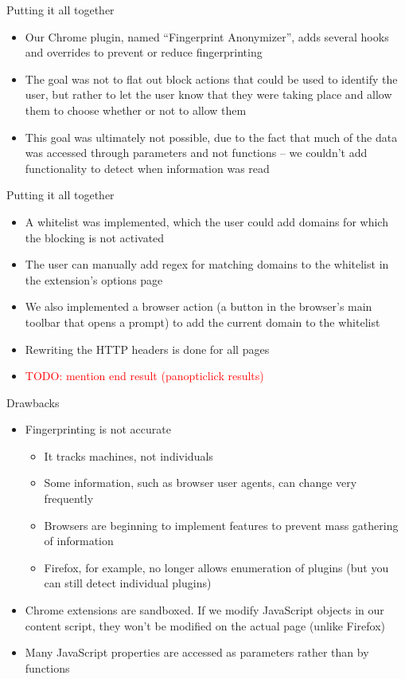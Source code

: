 \begin{frame}[fragile,t]{Putting it all together}
	\begin{itemize}
		\item Our Chrome plugin, named ``Fingerprint Anonymizer'', adds several hooks and overrides to prevent or reduce fingerprinting
		\item The goal was not to flat out block actions that could be used to identify the user, but rather to let the user know that they were taking place and allow them to choose whether or not to allow them
		\item This goal was ultimately not possible, due to the fact that much of the data was accessed through parameters and not functions -- we couldn't add functionality to detect when information was read
	\end{itemize}
\end{frame}

\begin{frame}[fragile,t]{Putting it all together}
	\begin{itemize}
		\item A whitelist was implemented, which the user could add domains for which the blocking is not activated
		\item The user can manually add regex for matching domains to the whitelist in the extension's options page
		\item We also implemented a browser action (a button in the browser's main toolbar that opens a prompt) to add the current domain to the whitelist
		\item Rewriting the HTTP headers is done for all pages
		\item \textcolor{red}{TODO: mention end result (panopticlick results)}
	\end{itemize}
\end{frame}

\begin{frame}[fragile,t]{Drawbacks}
	\begin{itemize}
		\item Fingerprinting is not accurate
		\begin{itemize}
			\item It tracks machines, not individuals
			\item Some information, such as browser user agents, can change very frequently
			\item Browsers are beginning to implement features to prevent mass gathering of information
			\item Firefox, for example, no longer allows enumeration of plugins (but you can still detect individual plugins)
		\end{itemize}
		\item Chrome extensions are sandboxed. If we modify JavaScript objects in our content script, they won't be modified on the actual page (unlike Firefox)
		\item Many JavaScript properties are accessed as parameters rather than by functions
	\end{itemize}
\end{frame}

